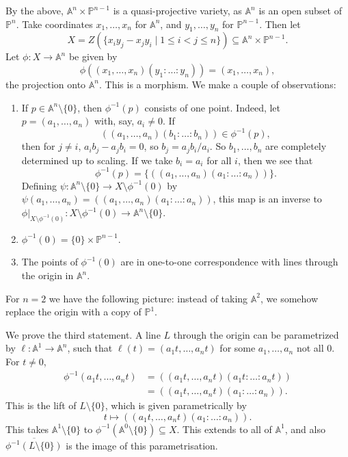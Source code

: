 \documentclass[12pt]{article}
\begin{document}
\begin{exbox}
	By the above, $\mathbb{A}^n \times \mathbb{P}^{n-1}$ is a quasi-projective variety, as $\mathbb{A}^n$ is an open subset of $\mathbb{P}^n$. Take coordinates $x_1, \ldots, x_n$ for $\mathbb{A}^n$, and $y_1, \ldots, y_n$ for $\mathbb{P}^{n-1}$. Then let
	\[
		X = Z (\{x_i y_j - x_j y_i \mid 1 \leq i < j \leq n\}) \subseteq \mathbb{A}^n \times \mathbb{P}^{n-1}.
	\]
	Let $\phi : X \to \mathbb{A}^n$ be given by
	\[
	\phi((x_1, \ldots, x_n)(y_1: \ldots: y_n)) = (x_1, \ldots, x_n),
	\]
	the projection onto $\mathbb{A}^n$. This is a morphism. We make a couple of observations:
	\begin{enumerate}
		\item If $p \in \mathbb{A}^n \setminus \{0\}$, then $\phi^{-1}(p)$ consists of one point. Indeed, let $p = (a_1, \ldots, a_n)$ with, say, $a_i \neq 0$. If
			\[
				((a_1, \ldots, a_n)(b_1 : \ldots: b_n)) \in \phi^{-1}(p),
			\]
			then for $j \neq i$, $a_i b_j - a_j b_i = 0$, so $b_j = a_jb_i/a_i$. So $b_1, \ldots, b_n$ are completely determined up to scaling. If we take $b_i = a_i$ for all $i$, then we see that
			\[
				\phi^{-1}(p) = \{((a_1, \ldots, a_n)(a_1 : \ldots : a_n))\}.
			\]
			Defining $\psi : \mathbb{A}^n \setminus \{0\} \to X \setminus \phi^{-1}(0)$ by $\psi(a_1, \ldots, a_n) = ((a_1, \ldots, a_n)(a_1 : \ldots: a_n))$, this map is an inverse to $\phi|_{X \setminus \phi^{-1}(0)} : X \setminus \phi^{-1}(0) \to \mathbb{A}^n \setminus \{0\}$.
		\item $\phi^{-1}(0) = \{0\} \times \mathbb{P}^{n-1}$.
		\item The points of $\phi^{-1}(0)$ are in one-to-one correspondence with lines through the origin in $\mathbb{A}^n$.
	\end{enumerate}
	For $n = 2$ we have the following picture: instead of taking $\mathbb{A}^2$, we somehow replace the origin with a copy of $\mathbb{P}^1$.

	We prove the third statement. A line $L$ through the origin can be parametrized by $\ell : \mathbb{A}^1 \to \mathbb{A}^n$, such that $\ell(t) = (a_1 t, \ldots, a_n t)$ for some $a_1, \ldots, a_n$ not all $0$. For $t \neq 0$,
	\begin{align*}
		\phi^{-1}(a_1t, \ldots, a_nt) &= ((a_1 t, \ldots, a_nt)(a_1t:\ldots:a_nt))\\
					      &=((a_1t,\ldots,a_nt)(a_1:\ldots:a_n)).
	\end{align*}
	This is the lift of $L \setminus\{0\}$, which is given parametrically by
	\[
	t \mapsto ((a_1t,\ldots,a_nt)(a_1:\ldots:a_n)).
	\]
	This takes $\mathbb{A}^1\setminus\{0\}$ to $\phi^{-1}(\mathbb{A}^0\setminus\{0\})\subseteq X$. This extends to all of $\mathbb{A}^1$, and also $\overline{\phi^{-1}(L\setminus\{0\})}$ is the image of this parametrisation.


\end{exbox}
\end{document}
